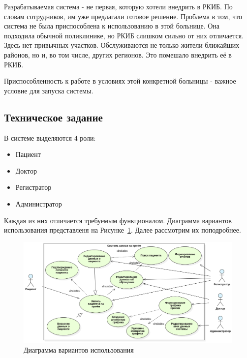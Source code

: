 \documentclass[a4paper,article]{article}
\begin{document}
        Разрабатываемая система - не первая, которую хотели внедрить в РКИБ. По словам сотрудников, им уже предлагали готовое решение. Проблема в том, что система не была приспособлена к использованию в этой больнице. Она подходила обычной поликлинике, но РКИБ слишком сильно от них отличается. Здесь нет привычных участков. Обслуживаются не только жители ближайших районов, но и, во том числе, других регионов. Это помешало внедрить её в РКИБ.

        Приспособленность к работе в условиях этой конкретной больницы - важное условие для запуска системы.

    \subsection{Техническое задание}

        В системе выделяются 4 роли:

        \begin{itemize}[nolistsep]
            \item Пациент
            \item Доктор
            \item Регистратор
            \item Администратор
        \end{itemize}

        Каждая из них отличается требуемым функционалом. Диаграмма вариантов использования представленя на Рисунке~\ref{fig:Диаграмма вариантов использования}. Далее рассмотрим их поподробнее.

        \begin{figure}[h]

            \centering

            \includegraphics[width=0.8\linewidth]{Диаграмма вариантов использования.png}

            \caption{\centering Диаграмма вариантов использования}

            \label{fig:Диаграмма вариантов использования}

        \end{figure}
\end{document}
